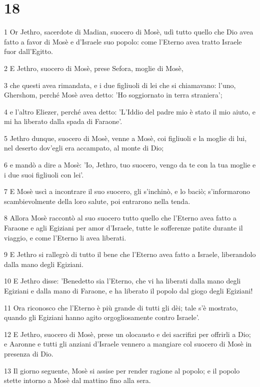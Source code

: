 \chapter{18}

\par 1 Or Jethro, sacerdote di Madian, suocero di Mosè, udì tutto quello che Dio avea fatto a favor di Mosè e d'Israele suo popolo: come l'Eterno avea tratto Israele fuor dall'Egitto.
\par 2 E Jethro, suocero di Mosè, prese Sefora, moglie di Mosè,
\par 3 che questi avea rimandata, e i due figliuoli di lei che si chiamavano: l'uno, Ghershom, perché Mosè avea detto: 'Ho soggiornato in terra straniera';
\par 4 e l'altro Eliezer, perché avea detto: 'L'Iddio del padre mio è stato il mio aiuto, e mi ha liberato dalla spada di Faraone'.
\par 5 Jethro dunque, suocero di Mosè, venne a Mosè, coi figliuoli e la moglie di lui, nel deserto dov'egli era accampato, al monte di Dio;
\par 6 e mandò a dire a Mosè: 'Io, Jethro, tuo suocero, vengo da te con la tua moglie e i due suoi figliuoli con lei'.
\par 7 E Mosè uscì a incontrare il suo suocero, gli s'inchinò, e lo baciò; s'informarono scambievolmente della loro salute, poi entrarono nella tenda.
\par 8 Allora Mosè raccontò al suo suocero tutto quello che l'Eterno avea fatto a Faraone e agli Egiziani per amor d'Israele, tutte le sofferenze patite durante il viaggio, e come l'Eterno li avea liberati.
\par 9 E Jethro si rallegrò di tutto il bene che l'Eterno avea fatto a Israele, liberandolo dalla mano degli Egiziani.
\par 10 E Jethro disse: 'Benedetto sia l'Eterno, che vi ha liberati dalla mano degli Egiziani e dalla mano di Faraone, e ha liberato il popolo dal giogo degli Egiziani!
\par 11 Ora riconosco che l'Eterno è più grande di tutti gli dèi; tale s'è mostrato, quando gli Egiziani hanno agito orgogliosamente contro Israele'.
\par 12 E Jethro, suocero di Mosè, prese un olocausto e dei sacrifizi per offrirli a Dio; e Aaronne e tutti gli anziani d'Israele vennero a mangiare col suocero di Mosè in presenza di Dio.
\par 13 Il giorno seguente, Mosè si assise per render ragione al popolo; e il popolo stette intorno a Mosè dal mattino fino alla sera.

